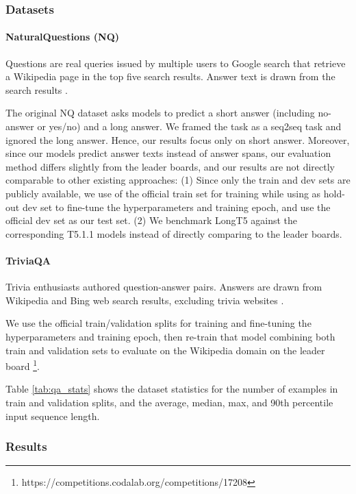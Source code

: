 \documentclass[11pt]{article}
\begin{document}
\subsubsection{Datasets}\label{subsec:qa-datasets}
\vspace{-1mm}
\paragraph{NaturalQuestions (NQ)} Questions are real queries issued by multiple users to Google search that retrieve a Wikipedia page in the top five search results. Answer text is drawn from the search results \cite{naturalquestions}.

The original NQ dataset asks models to predict a short answer (including no-answer or yes/no) and a long answer. We framed the task as a seq2seq task and ignored the long answer. Hence, our results focus only on short answer. Moreover, since our models predict answer texts instead of answer spans, our evaluation method differs slightly from the leader boards, and our results are not directly comparable to other existing approaches: (1) Since only the train and dev sets are publicly available, we use  of the official train set for training while using  as hold-out dev set to fine-tune the hyperparameters and training epoch, and use the official dev set as our test set. (2) We benchmark LongT5 against the corresponding T5.1.1 models instead of directly comparing to the leader boards.
\vspace{-1mm}
\paragraph{TriviaQA} Trivia enthusiasts authored question-answer pairs.
Answers are drawn from Wikipedia and Bing web search results, excluding trivia websites \cite{triviaqa}.

We use the official train/validation splits for training and fine-tuning the hyperparameters and training epoch, then re-train that model combining both train and validation sets to evaluate on the Wikipedia domain on the leader board \footnote{https://competitions.codalab.org/competitions/17208}.




Table \ref{tab:qa_stats} shows the dataset statistics for the number of examples in train and validation splits, and the average, median, max, and 90th percentile input sequence length.
\subsubsection{Results}
\end{document}
